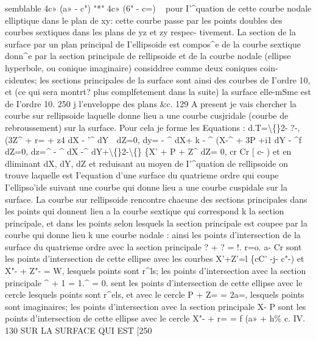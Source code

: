 \documentclass[11pt,a4paper]{book}
\begin{document}
semblable
4c»  (a»  -  c")  "*"  4c»  (6"  -  c=)  ~
pour  I'^quation  de  cette  courbe  nodale  elliptique  dans  le  plan  de  xy:  cette  courbe
passe  par  les  points  doubles  des  courbes  sextiques  dans  les  plans  de  yz  et  zy  respec-
tivement. La  section  de  la  surface  par  un  plan  principal  de  I'ellipsoide  est  compos^e
de  la  courbe  sextique  donn^e  par  la  section  principale  de  rellipsoide  et  de  la  courbe
nodale  (ellipse  hyperbole,  ou  conique  imaginaire)  considdree  comme  deux  coniques  coin-
cidentes;  les  sections  principales  de  la  surface  sont  ainsi  des  courbes  de  I'ordre  10,  et
(ce  qui  sera  montrt?  plus  complfetement  dans  la  suite)  la  surface  elle-mSme  est  de
I'ordre  10.
250 j  l'enveloppe  des  plans  \&c.  129
A  present  je  vais  chercher  la  courbe  sur  rellipsoide  laquelle  donne  lieu  a  une
courbe  cusjridale  (courbe  de  rebroussement)  sur  la  surface.  Pour  cela  je  forme  les
Equations :
d.T=\textbackslash\{\}2-  ?-,
(3Z^  +  r=  +  z4  dX  -  '^  dY  ^^^
dZ=0,
dy=  -  ^  dX+  k  -  ^
(X-^  +  3P  +^^)1  dY  -  ^f  dZ=0,
dz=^  - ^ dX  -^  dY+\textbackslash\{\}2-\textbackslash\{\} \{X'  +  P  +  Z^ dZ=  0,
cr  Cr  [         c-  )
et  en  dliminant  dX,  dY,  dZ  et  reduisant  au  moyen  de  I'^quation  de  rellipsoide  on
trouve
laquelle  est  I'equation  d'une  surface  du  quatrieme  ordre  qui  coupe  I'ellipso'ide  suivant
une  courbe  qui  donne  lieu  a  une  courbe  cuspidale  sur  la  surface.  La  courbe  sur
rellipsoide  rencontre  chacune  des  sections  principales  dans  les  points  qui  donnent  lieu  a
la  courbe  sextique  qui  correspond  k  la  section  principale,  et  dans  les  points  selon
lesquels  la  section  principale  est  coupee  par  la  courbe  qui  donne  lieu  k  une  courbe
nodale :  ainsi  les  points  d'intersection  de  la  surface  du  quatrieme  ordre  avec  la  section
principale
?  +  ?  =  !.  r=o.
a-       Cr
sont  les  points  d'intersection  de  cette  ellipse  avec  les  courbes
X'+Z'=l  \{cC'  -j-  c"-)  et  X"-  +  Z"-  =  W,
lesquels  points  sont  r^ls;  les  points  d'intersection  avec  la  section  principale
^
+  1
=  1.^  =  0.
sent  les  points  d'intersection  de  cette  ellipse  avec  le  cercle
lesquels  points  sont  r^els,  et  avec  le  cercle
P  +  Z=  =  2a=,
lesquels  points  sont  imaginaires;   les  points  d'intersection  avec  la  section  principale
X-     P
sont  les  points  d'intersection  de  cette  ellipse  avec  le  cercle
X"-  +  r=  =  f  (a»  +  h\%
c.  IV.
130  SUR   LA   SURFACE  QUI   EST  [250
\end{document}

